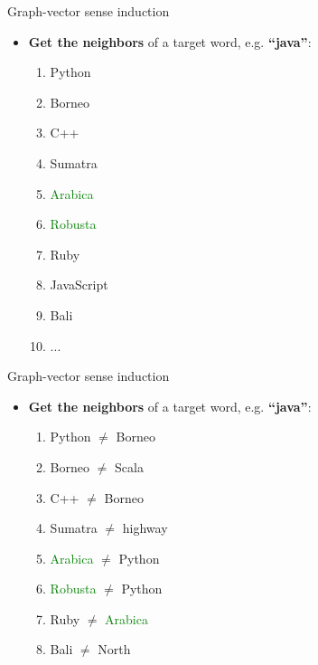 \begin{frame}{ Graph-vector sense induction }

\begin{itemize}
	\item \textbf{Get the neighbors} of a target word, e.g. \textbf{``java''}:
	\begin{enumerate}
	\item \alert{Python}
	\item \textcolor{Cerulean}{Borneo}
	\item \alert{C++}
	\item \textcolor{Cerulean}{Sumatra}
	\item \textcolor{Green}{Arabica}
    \item \textcolor{Green}{Robusta}
	\item \alert{Ruby}
	\item \alert{JavaScript}
	\item \textcolor{Cerulean}{Bali}

	\item ...
	\end{enumerate}

\end{itemize}

\end{frame}




\begin{frame}{ Graph-vector sense induction }

\begin{itemize}
	\item \textbf{Get the neighbors} of a target word, e.g. \textbf{``java''}:
	\begin{enumerate}
	\item \alert{Python} $\neq$ \textcolor{Cerulean}{Borneo}
	\item \textcolor{Cerulean}{Borneo} $\neq$ \alert{Scala}
	\item \alert{C++} $\neq$ \textcolor{Cerulean}{Borneo}
	\item \textcolor{Cerulean}{Sumatra} $\neq$ highway
	\item \textcolor{Green}{Arabica} $\neq$ \alert{Python}
    \item \textcolor{Green}{Robusta} $\neq$ \alert{Python}
	\item \alert{Ruby} $\neq$ \textcolor{Green}{Arabica}
	\item \textcolor{Cerulean}{Bali} $\neq$ North
	\end{enumerate}

\end{itemize}
\end{frame}




